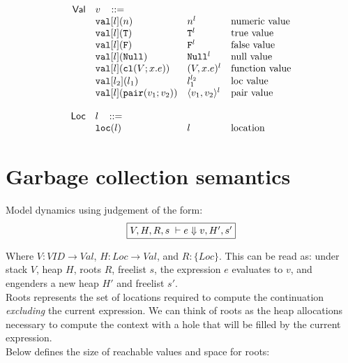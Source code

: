 \documentclass[11pt]{article}
\newcommand{\ms}[1]{\ensuremath{\mathsf{#1}}}
\newcommand{\irl}[1]{\mathtt{#1}}
\begin{document}
\[\begin{array}{r l l l l}
  \\
\ms{Val}
        & v   \,\,\,\,\, ::= \\
 	& \irl{val}[l](n)                                			& n^l 												& \text{numeric value}\\
 	& \irl{val}[l](\irl{T})                               			& \irl{T}^l 								  & \text{true value}\\
 	& \irl{val}[l](\irl{F})                                			& \irl{F}^l								  & \text{false value}\\
 	& \irl{val}[l](\irl{Null})                                  & \irl{Null}^l 								  & \text{null value}\\
 	& \irl{val}[l](\irl{cl}(V; x.e))                & (V, x.e)^l 					& \text{function value}\\
 	& \irl{val}[l_2](l_1)                                			& l_1^{l_2} 								  & \text{loc value}\\
 	& \irl{val}[l](\pairexabt{v_1}{v_2})                             & \pairexcst{v_1}{v_2}^l 								  & \text{pair value}\\
  \\
\ms{Loc}
        & l   \,\,\,\,\, ::= \\
 	& \irl{loc}(l)                                			& l 												& \text{location}\\
\end{array}
\]

\section{Garbage collection semantics}

Model dynamics using judgement of the form:
\[
\fbox{$V,H,R,s \; \vdash e \Downarrow v, H', s'$}
\]

Where $V : VID \to Val$, $H : Loc \to Val$, and $R : \{Loc\}$. This can be read as: under stack $V$, heap $H$, roots $R$,
freelist $s$, the expression $e$ evaluates to $v$, and engenders a new heap $H'$ and freelist $s'$.\\

Roots represents the set of locations required to compute the continuation \emph{excluding} the current expression.
We can think of roots as the heap allocations necessary to compute the context with a hole that will be filled
by the current expression.\\

Below defines the size of reachable values and space for roots:
\end{document}
